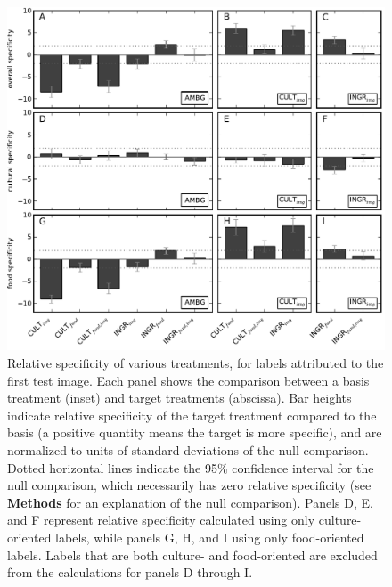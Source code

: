 \documentclass[a4paper]{report}
\begin{document}
\begin{figure}
	\includegraphics{../figs/specificity-test0.pdf}
	\caption{Relative specificity of various treatments, for labels attributed
		to the first test image.
		Each panel shows the comparison between a basis treatment (inset) and 
		target treatments (abscissa).
		Bar heights indicate relative specificity of the target 
		treatment compared to the basis (a positive quantity means the target 
		is more specific), and are normalized to units of standard 
		deviations of the null comparison.  Dotted horizontal lines indicate
		the 95\% confidence interval for the null comparison, which necessarily
		has zero relative specificity (see \textbf{Methods} 
		for an explanation of the null comparison).  Panels D, E, and F 
		represent relative specificity calculated using only culture-oriented
		labels, while panels G, H, and I using only food-oriented labels.
		Labels that are both culture- and food-oriented are excluded from the
		calculations for panels D through I.
		}
	\end{figure}
\end{document}
